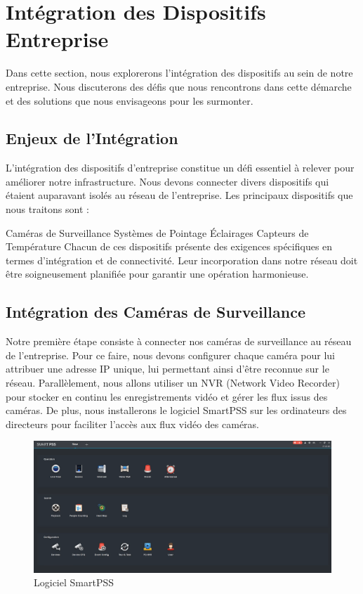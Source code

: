\section{Intégration des Dispositifs Entreprise}

Dans cette section, nous explorerons l'intégration des dispositifs au sein de notre entreprise. Nous discuterons des défis que nous rencontrons dans cette démarche et des solutions que nous envisageons pour les surmonter.

\subsection{Enjeux de l'Intégration}

L'intégration des dispositifs d'entreprise constitue un défi essentiel à relever pour améliorer notre infrastructure. Nous devons connecter divers dispositifs qui étaient auparavant isolés au réseau de l'entreprise. Les principaux dispositifs que nous traitons sont :

Caméras de Surveillance
Systèmes de Pointage
Éclairages
Capteurs de Température
Chacun de ces dispositifs présente des exigences spécifiques en termes d'intégration et de connectivité. Leur incorporation dans notre réseau doit être soigneusement planifiée pour garantir une opération harmonieuse.

\subsection{Intégration des Caméras de Surveillance}

Notre première étape consiste à connecter nos caméras de surveillance au réseau de l'entreprise. Pour ce faire, nous devons configurer chaque caméra pour lui attribuer une adresse IP unique, lui permettant ainsi d'être reconnue sur le réseau. Parallèlement, nous allons utiliser un NVR (Network Video Recorder) pour stocker en continu les enregistrements vidéo et gérer les flux issus des caméras. De plus, nous installerons le logiciel SmartPSS sur les ordinateurs des directeurs pour faciliter l'accès aux flux vidéo des caméras.

\begin{figure}[H]
\centering
\includegraphics[width=15cm]{Images/SmartPSS-Logiciel.png}
\caption{Logiciel SmartPSS}
\label{Chap4.2.4}
\end{figure}
\smallskip

